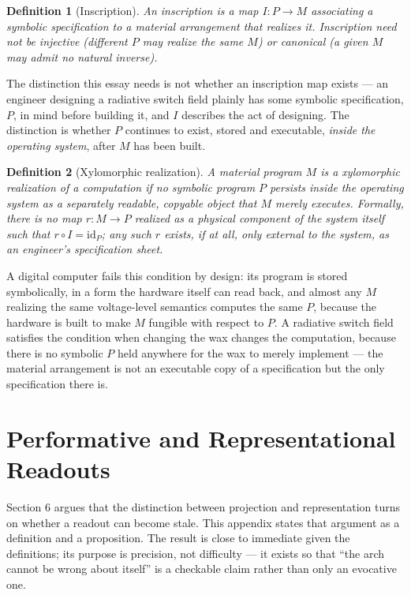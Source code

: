 \documentclass[11pt]{article}
\newtheorem{definition}{Definition}
\begin{document}
\begin{definition}[Inscription]
An inscription is a map $I: P \to M$ associating a symbolic specification to a material arrangement that realizes it. Inscription need not be injective (different $P$ may realize the same $M$) or canonical (a given $M$ may admit no natural inverse).
\end{definition}

The distinction this essay needs is not whether an inscription map exists --- an engineer designing a radiative switch field plainly has some symbolic specification, $P$, in mind before building it, and $I$ describes the act of designing. The distinction is whether $P$ continues to exist, stored and executable, \emph{inside the operating system}, after $M$ has been built.

\begin{definition}[Xylomorphic realization]
A material program $M$ is a xylomorphic realization of a computation if no symbolic program $P$ persists inside the operating system as a separately readable, copyable object that $M$ merely executes. Formally, there is no map $r: M \to P$ realized as a physical component of the system itself such that $r \circ I = \mathrm{id}_P$; any such $r$ exists, if at all, only external to the system, as an engineer's specification sheet.
\end{definition}

A digital computer fails this condition by design: its program is stored symbolically, in a form the hardware itself can read back, and almost any $M$ realizing the same voltage-level semantics computes the same $P$, because the hardware is built to make $M$ fungible with respect to $P$. A radiative switch field satisfies the condition when changing the wax changes the computation, because there is no symbolic $P$ held anywhere for the wax to merely implement --- the material arrangement is not an executable copy of a specification but the only specification there is.

\section{Performative and Representational Readouts}

Section 6 argues that the distinction between projection and representation turns on whether a readout can become stale. This appendix states that argument as a definition and a proposition. The result is close to immediate given the definitions; its purpose is precision, not difficulty --- it exists so that ``the arch cannot be wrong about itself'' is a checkable claim rather than only an evocative one.
\end{document}
